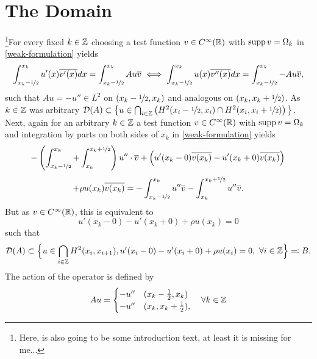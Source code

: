 \chapter{The Domain}

\footnote{Here, is also going to be some introduction text, at least it is missing for me...}For every fixed $k \in \mathbb{Z}$ choosing a test function $v \in C^{\infty}(\mathbb{R})$ with $\operatorname{supp} v = \Omega_{k}$  in \eqref{weak-formulation} yields
	\[ \int_{x_{k}-\nicefrac{1}{2}}^{x_{k}} u'(x) \overline{v'(x)} dx = \int_{x_{k}-\nicefrac{1}{2}}^{x_{k}} A u \overline{v} \iff \int_{x_{k}-\nicefrac{1}{2}}^{x_{k}} u(x) \overline{v''(x)} dx = \int_{x_{k}-\nicefrac{1}{2}}^{x_{k}} - A u \overline{v}, \]
such that $A u = - u'' \in L^{2}$ on $(x_{k} -\nicefrac{1}{2}, x_{k})$ and analogous on $(x_{k}, x_{k} + \nicefrac{1}{2})$.
As $k \in \mathbb{Z}$ was arbitrary $\mathcal{D}(A) \subset \big\{ u \in \bigcap_{i \in \mathbb{Z}} \left( H^{2}(x_{i}-\nicefrac{1}{2}, x_{i}) \cap H^{2}(x_{i}, x_{i} + \nicefrac{1}{2}) \right)\big\}$. \\

Next, again for an arbitrary $k \in \mathbb{Z}$ a test function $v \in C^{\infty}(\mathbb{R})$ with $\operatorname{supp} v = \Omega_{k}$ and integration by parts on both sides of $x_{k}$ in \eqref{weak-formulation} yields
	\[ -\left( \int_{x_{k}-\nicefrac{1}{2}}^{x_{k}} + \int_{x_{k}}^{x_{k} + \nicefrac{1}{2}}\right) u'' \cdot \overline{v} + \left( u'(x_{k}-0) \overline{v(x_{k})} - u'(x_{k} + 0) \overline{v(x_{k})} \right) \\ \]
	\[ +  \rho u(x_{k})\overline{v(x_{k})} = - \int_{x_{k} - \nicefrac{1}{2}}^{x_{k}} u'' \overline{v} - \int_{x_{k}}^{x_{k} + \nicefrac{1}{2}} u'' \overline{v}. \]
But as $v \in C^{\infty}(\mathbb{R})$, this is equivalent to
	\[ u'(x_{k}-0) - u'(x_{k}+0) + \rho u(x_{k}) = 0 \]
such that
	\begin{align*}
		\mathcal{D}(A) \subset \Big\{ u \in \bigcap_{i \in \mathbb{Z}} H^{2}(x_{i}, x_{i + 1}), u'(x_{i} - 0) - u'(x_{i} + 0) + \rho u(x_{i}) = 0 , ~\forall i \in \mathbb{Z} \Big\} \eqqcolon B.
	\end{align*} 
The action of the operator is defined by
	\[ A u = \begin{cases}
					- u'' & (x_{k} - \frac{1}{2}, x_{k}) \\
					- u'' & (x_{k}, x_{k} + \frac{1}{2}),
				\end{cases} \quad \forall k \in \mathbb{Z} \]
				
